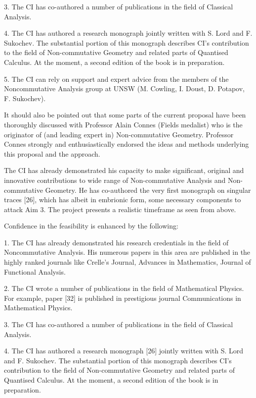 \documentclass[12pt]{article}
\newcommand{\archeading}[1]{\vspace{.3cm} \noindent{\bfseries #1} \vspace{.1cm}   }
\begin{document}
3. The CI has co-authored a number of publications in the field of Classical Analysis.

4. The CI has authored a research monograph \cite{book} jointly written with S. Lord and F. Sukochev. The substantial portion of this monograph describes CI's contribution to the field of Non-commutative Geometry and related parts of Quantised Calculus. At the moment, a second edition of the book is in preparation.

5. The CI can rely on support and expert advice from the members of the Noncommutative
Analysis group at UNSW (M. Cowling, I. Doust, D. Potapov, F. Sukochev).

It should also be pointed out that some parts of the current proposal have been thoroughly discussed with Professor Alain Connes (Fields medalist) who is the originator of (and leading expert in) Non-commutative Geometry. Professor Connes strongly and enthusiastically endorsed the ideas and methods underlying this proposal and the approach.



\bigskip\archeading{Benefit and collaboration}

The CI has already demonstrated his capacity to make significant, original and innovative contributions to wide range of Non-commutative Analysis and Non-commutative Geometry. He has co-authored the very first monograph on singular traces [26], which has albeit in embrionic form, some necessary components to attack Aim 3. The project presents a realistic timeframe as seen from above.

Confidence in the feasibility is enhanced by the following:

1. The CI has already demonstrated his research credentials in the field of Noncommutative Analysis. His numerous papers in this area are published in the highly ranked journals like Crelle’s Journal, Advances in Mathematics, Journal of Functional Analysis.

2. The CI wrote a number of publications in the field of Mathematical Physics. For example, paper [32] is published in prestigious journal Communications in Mathematical Physics.

3. The CI has co-authored a number of publications in the field of Classical Analysis.

4. The CI has authored a research monograph [26] jointly written with S. Lord and F. Sukochev. The substantial portion of this monograph describes CI’s contribution to the field of Non-commutative Geometry and related parts of Quantised Calculus. At the moment, a second edition of the book is in preparation.
\end{document}
